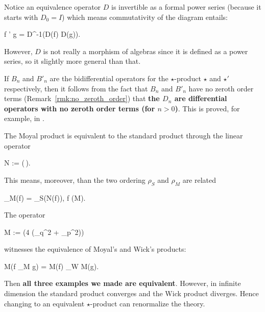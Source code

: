 \begin{remark}
	Notice an equivalence operator $D$ is invertible as a formal power series (because it starts with $D_0 = I$) which means commutativity of the diagram entails:
	\begin{eqalign}
	\label{eq:equiv_operator}
		f \star' g = D^{-1}(D(f) \star D(g)).
	\end{eqalign}
	However, $D$ is not really a morphism of algebras since it is defined as a power series, so it slightly more general than that.
\end{remark}
\begin{remark}
	If $B_n$ and $B'_n$ are the bidifferential operators for the $\star$-product $\star$ and $\star'$ respectively, then it follows from the fact that $B_n$ and $B'_n$ have no zeroth order terms (Remark~\ref{rmk:no_zeroth_order}) that \textbf{the $D_n$ are differential operators with no zeroth order terms (for $n > 0$)}. This is proved, for example, in \cite[Theorem 2.22]{gutt1999equivalence}.
\end{remark}

\begin{example}
	The Moyal product is equivalent to the standard product through the linear operator
	\begin{eqalign}
		N := \exp\left(\,\right).
	\end{eqalign}
	This means, moreover, than the two ordering $\rho_S$ and $\rho_M$ are related
	\begin{eqalign}
		\rho_M(f) = \rho_S(N(f)), \quad \forall f \in \Cinfty(M).
	\end{eqalign}
\end{example}
\begin{example}
	The operator
	\begin{eqalign}
		M := \exp\left(\frac{\planck}4 (\partial_q^2 + \partial_p^2)\right)
	\end{eqalign}
	witnesses the equivalence of Moyal's and Wick's products:
	\begin{eqalign}
		M(f \star_M g) = M(f) \star_W M(g).
	\end{eqalign}
	Then \textbf{all three examples we made are equivalent}. However, in infinite dimension the standard product converges and the Wick product diverges. Hence changing to an equivalent $\star$-product can renormalize the theory.
\end{example}

